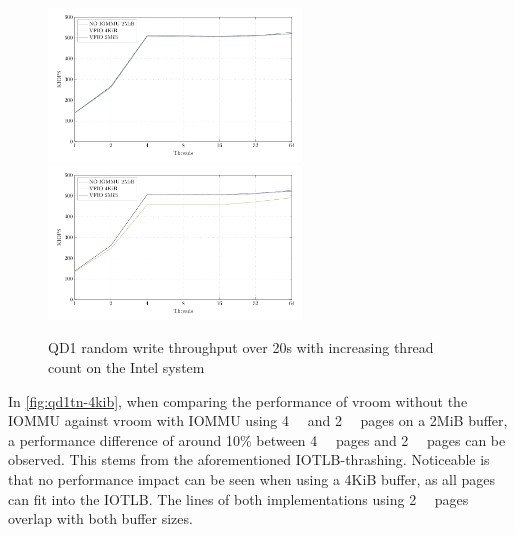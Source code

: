 \begin{figure}[H]
  \centering
   {\includegraphics[width=0.6\textwidth]{figures/qd1tn_1page}}
   {\includegraphics[width=0.6\textwidth]{figures/qd1tn_512page}}
  \caption{QD1 random write throughput over 20s with increasing thread count on the Intel system}
  \label{fig:qd1tn-4kib}
\end{figure}

In \autoref{fig:qd1tn-4kib}, when comparing the performance of vroom without the IOMMU against vroom with IOMMU using \qty{4}{\kibi\byte} and \qty{2}{\mebi\byte} pages on a 2MiB buffer, a performance difference of around 10\% between \qty{4}{\kibi\byte} pages and \qty{2}{\mebi\byte} pages can be observed. This stems from the aforementioned IOTLB-thrashing. Noticeable is that no performance impact can be seen when using a 4KiB buffer, as all pages can fit into the IOTLB. The lines of both implementations using \qty{2}{\mebi\byte} pages overlap with both buffer sizes.

